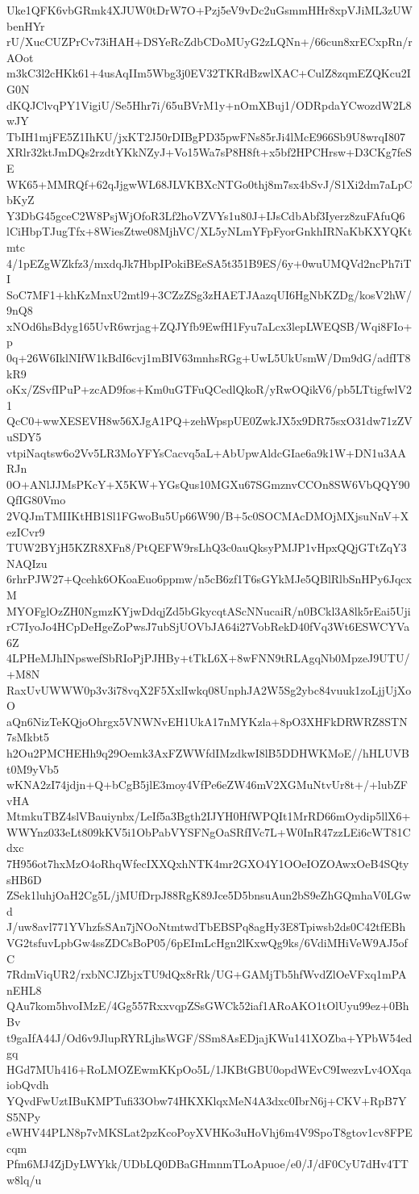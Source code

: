 Uke1QFK6vbGRmk4XJUW0tDrW7O+Pzj5eV9vDc2uGsmmHHr8xpVJiML3zUWbenHYr
rU/XucCUZPrCv73iHAH+DSYeRcZdbCDoMUyG2zLQNn+/66cun8xrECxpRn/rAOot
m3kC3l2cHKk61+4usAqIIm5Wbg3j0EV32TKRdBzwlXAC+CulZ8zqmEZQKcu2IG0N
dKQJClvqPY1VigiU/Se5Hhr7i/65uBVrM1y+nOmXBuj1/ODRpdaYCwozdW2L8wJY
TbIH1mjFE5Z1IhKU/jxKT2J50rDIBgPD35pwFNs85rJi4lMcE966Sb9U8wrqI807
XRlr32ktJmDQs2rzdtYKkNZyJ+Vo15Wa7sP8H8ft+x5bf2HPCHrsw+D3CKg7feSE
WK65+MMRQf+62qJjgwWL68JLVKBXcNTGo0thj8m7sx4bSvJ/S1Xi2dm7aLpCbKyZ
Y3DbG45gceC2W8PsjWjOfoR3Lf2hoVZVYs1u80J+IJsCdbAbf3Iyerz8zuFAfuQ6
lCiHbpTJugTfx+8WiesZtwe08MjhVC/XL5yNLmYFpFyorGnkhIRNaKbKXYQKtmtc
4/1pEZgWZkfz3/mxdqJk7HbpIPokiBEeSA5t351B9ES/6y+0wuUMQVd2ncPh7iTI
SoC7MF1+khKzMnxU2mtl9+3CZzZSg3zHAETJAazqUI6HgNbKZDg/kosV2hW/9nQ8
xNOd6hsBdyg165UvR6wrjag+ZQJYfb9EwfH1Fyu7aLcx3lepLWEQSB/Wqi8FIo+p
0q+26W6IklNIfW1kBdI6cvj1mBIV63mnhsRGg+UwL5UkUsmW/Dm9dG/adfIT8kR9
oKx/ZSvfIPuP+zcAD9fos+Km0uGTFuQCedlQkoR/yRwOQikV6/pb5LTtigfwlV21
QcC0+wwXESEVH8w56XJgA1PQ+zehWpspUE0ZwkJX5x9DR75sxO31dw71zZVuSDY5
vtpiNaqtsw6o2Vv5LR3MoYFYsCacvq5aL+AbUpwAldcGIae6a9k1W+DN1u3AARJn
0O+ANlJJMsPKcY+X5KW+YGsQus10MGXu67SGmznvCCOn8SW6VbQQY90QfIG80Vmo
2VQJmTMIIKtHB1Sl1FGwoBu5Up66W90/B+5c0SOCMAcDMOjMXjsuNnV+XezICvr9
TUW2BYjH5KZR8XFn8/PtQEFW9rsLhQ3c0auQksyPMJP1vHpxQQjGTtZqY3NAQIzu
6rhrPJW27+Qcehk6OKoaEuo6ppmw/n5cB6zf1T6sGYkMJe5QBlRlbSnHPy6JqcxM
MYOFglOzZH0NgmzKYjwDdqjZd5bGkycqtAScNNucaiR/n0BCkl3A8lk5rEai5Uji
rC7IyoJo4HCpDeHgeZoPwsJ7ubSjUOVbJA64i27VobRekD40fVq3Wt6ESWCYVa6Z
4LPHeMJhINpswefSbRIoPjPJHBy+tTkL6X+8wFNN9tRLAgqNb0MpzeJ9UTU/+M8N
RaxUvUWWW0p3v3i78vqX2F5XxlIwkq08UnphJA2W5Sg2ybc84vuuk1zoLjjUjXoO
aQn6NizTeKQjoOhrgx5VNWNvEH1UkA17nMYKzla+8pO3XHFkDRWRZ8STN7sMkbt5
h2Ou2PMCHEHh9q29Oemk3AxFZWWfdIMzdkwI8lB5DDHWKMoE//hHLUVBt0M9yVb5
wKNA2zI74jdjn+Q+bCgB5jlE3moy4VfPe6eZW46mV2XGMuNtvUr8t+/+lubZFvHA
MtmkuTBZ4slVBauiynbx/LeIf5a3Bgth2IJYH0HfWPQIt1MrRD66mOydip5llX6+
WWYnz033eLt809kKV5i1ObPabVYSFNgOaSRfIVc7L+W0InR47zzLEi6cWT81Cdxc
7H956ot7hxMzO4oRhqWfecIXXQxhNTK4mr2GXO4Y1OOeIOZOAwxOeB4SQtysHB6D
ZSek1luhjOaH2Cg5L/jMUfDrpJ88RgK89Jce5D5bnsuAun2bS9eZhGQmhaV0LGwd
J/uw8avl771YVhzfsSAn7jNOoNtmtwdTbEBSPq8agHy3E8Tpiwsb2ds0C42tfEBh
VG2tsfuvLpbGw4ssZDCsBoP05/6pEImLcHgn2lKxwQg9ks/6VdiMHiVeW9AJ5ofC
7RdmViqUR2/rxbNCJZbjxTU9dQx8rRk/UG+GAMjTb5hfWvdZlOeVFxq1mPAnEHL8
QAu7kom5hvoIMzE/4Gg557RxxvqpZSsGWCk52iaf1ARoAKO1tOlUyu99ez+0BhBv
t9gaIfA44J/Od6v9JlupRYRLjhsWGF/SSm8AsEDjajKWu141XOZba+YPbW54edgq
HGd7MUh416+RoLMOZEwmKKpOo5L/1JKBtGBU0opdWEvC9IwezvLv4OXqaiobQvdh
YQvdFwUztIBuKMPTufi33Obw74HKXKlqxMeN4A3dxc0IbrN6j+CKV+RpB7YS5NPy
eWHV44PLN8p7vMKSLat2pzKcoPoyXVHKo3uHoVhj6m4V9SpoT8gtov1cv8FPEcqm
Pfm6MJ4ZjDyLWYkk/UDbLQ0DBaGHmnmTLoApuoe/e0/J/dF0CyU7dHv4TTw8lq/u

